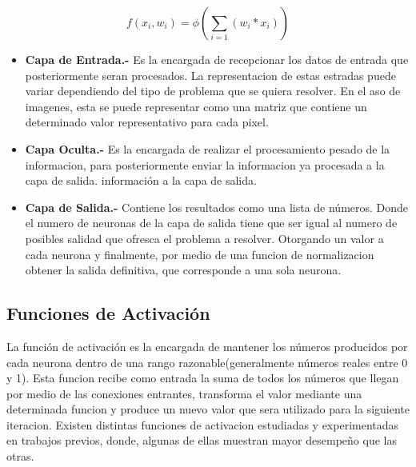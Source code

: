\begin{equation}\label{eq:neurona}
f(x_i, w_i) = \phi(\sum_{i=1}^{}(w_i * x_i))
\end{equation}


\begin{itemize}
\item \textbf{Capa de Entrada.- }Es la encargada de recepcionar los datos de entrada que posteriormente seran procesados. La representacion de estas estradas puede variar dependiendo del tipo de problema que se quiera resolver. En el aso de imagenes, esta se puede representar como una matriz que contiene un determinado valor representativo para cada pixel.
\item \textbf{Capa Oculta.- }Es la encargada de realizar el procesamiento pesado de la informacion, para posteriormente enviar la informacion ya procesada a la capa de salida.
información a la capa de salida.
\item \textbf{Capa de Salida.-} Contiene los resultados como una lista de números. Donde el numero de neuronas de la capa de salida tiene que ser igual al numero de posibles salidad que ofresca el problema a resolver. Otorgando un valor a cada neurona y finalmente, por medio de una funcion de normalizacion obtener la salida definitiva, que corresponde a una sola neurona.  
\end{itemize}


\subsection{Funciones de Activación}
La función de activación es la encargada de mantener los números producidos por cada neurona dentro de una rango razonable(generalmente números reales entre 0 y 1). Esta funcion recibe como entrada la suma de todos los números que llegan por medio de las conexiones entrantes, transforma el valor mediante una determinada funcion y produce un nuevo valor que sera utilizado para la siguiente iteracion. Existen distintas funciones de activacion estudiadas y experimentadas en trabajos previos, donde, algunas de ellas muestran mayor desempeño que las otras.

